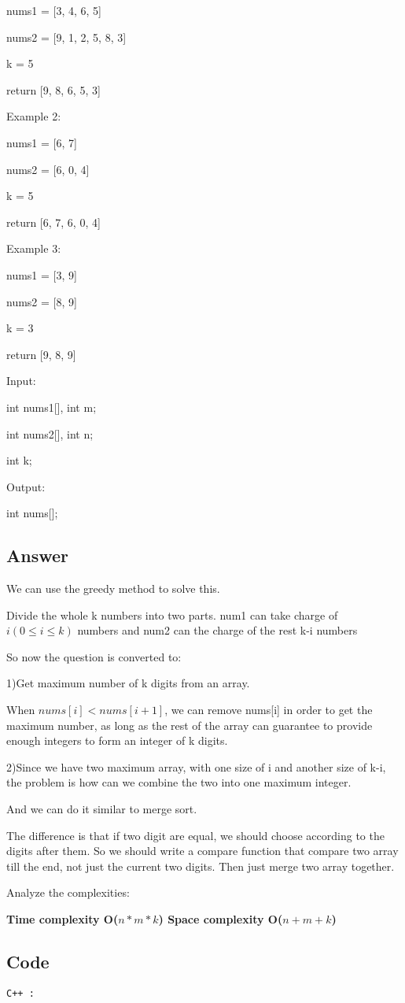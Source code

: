nums1 = [3, 4, 6, 5]

nums2 = [9, 1, 2, 5, 8, 3]

k = 5

return [9, 8, 6, 5, 3]

Example 2:

nums1 = [6, 7]

nums2 = [6, 0, 4]

k = 5

return [6, 7, 6, 0, 4]

Example 3:

nums1 = [3, 9]

nums2 = [8, 9]

k = 3

return [9, 8, 9]

Input:

int nums1[], int m;

int nums2[], int n;

int k;

Output:

int nums[];


\subsection{Answer}
We can use the greedy method to solve this.

Divide the whole k numbers into two parts.
num1 can take charge of $i(0\leq i\leq k)$ numbers and num2 can the charge of the rest k-i numbers

So now the question is converted to:
 
1)Get maximum number of k digits from an array.

When $nums[i] < nums[i + 1]$, we can remove nums[i] in order to get the maximum number, as long as the rest of the array can guarantee to provide enough integers to form an integer of k digits. 

2)Since we have two maximum array, with one size of i and another size of k-i, the problem is how can we combine the two into one maximum integer.

And we can do it similar to merge sort.

The difference is that if two digit are equal, we should choose according to the digits after them. So we should write a compare function that compare two array till the end, not just the current two digits. Then just merge two array together.

Analyze the complexities:

\textbf{\color{red}Time complexity O($n*m*k$) Space complexity O($n+m+k$)}

\subsection{Code}
\texttt{C++ :}


